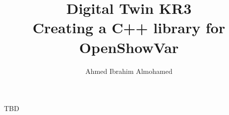 \documentclass[12pt]{article}
\date{\displaydate{date}}
\title{
    Digital Twin KR3 \\ \large Creating a C++ library for OpenShowVar
}
\author{
    Ahmed Ibrahim Almohamed
}
\begin{document}
\maketitle


\newpage
\Large TBD \cite{sanfilippo2015controlling}


\newpage


\end{document}
